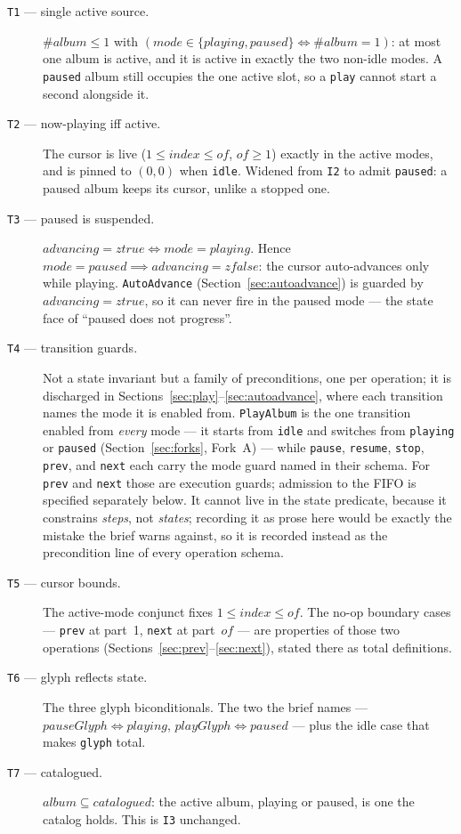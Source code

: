 \documentclass[a4paper,10pt,fleqn]{article}
\begin{document}
\begin{description}
  \item[\texttt{T1} --- single active source.] $\# album \leq 1$ with
    $(mode \in \{ playing, paused \} \iff \# album = 1)$: at most one album is
    active, and it is active in exactly the two non-idle modes. A \texttt{paused}
    album still occupies the one active slot, so a \texttt{play} cannot start a
    second alongside it.
  \item[\texttt{T2} --- now-playing iff active.] The cursor is live
    ($1 \leq index \leq of$, $of \geq 1$) exactly in the active modes, and is
    pinned to $(0,0)$ when \texttt{idle}. Widened from \texttt{I2} to admit
    \texttt{paused}: a paused album keeps its cursor, unlike a stopped one.
  \item[\texttt{T3} --- paused is suspended.] $advancing = ztrue \iff mode =
    playing$. Hence $mode = paused \implies advancing = zfalse$: the cursor
    auto-advances only while playing. \texttt{AutoAdvance}
    (Section~\ref{sec:autoadvance}) is guarded by $advancing = ztrue$, so it can
    never fire in the paused mode --- the state face of ``paused does not
    progress''.
  \item[\texttt{T4} --- transition guards.] Not a state invariant but a family
    of preconditions, one per operation; it is discharged in
    Sections~\ref{sec:play}--\ref{sec:autoadvance}, where each transition names
    the mode it is enabled from. \texttt{PlayAlbum} is the one transition
    enabled from \emph{every} mode --- it starts from \texttt{idle} and switches
    from \texttt{playing} or \texttt{paused} (Section~\ref{sec:forks},
    Fork~A) --- while \texttt{pause}, \texttt{resume}, \texttt{stop},
    \texttt{prev}, and \texttt{next} each carry the mode guard named in their
    schema. For \texttt{prev} and \texttt{next} those are execution guards;
    admission to the FIFO is specified separately below.
    It cannot live in the state predicate, because it constrains
    \emph{steps}, not \emph{states}; recording it as prose here would be
    exactly the mistake the brief warns against, so it is recorded instead as
    the precondition line of every operation schema.
  \item[\texttt{T5} --- cursor bounds.] The active-mode conjunct fixes
    $1 \leq index \leq of$. The no-op boundary cases --- \texttt{prev} at part~1,
    \texttt{next} at part~$of$ --- are properties of those two operations
    (Sections~\ref{sec:prev}--\ref{sec:next}), stated there as total
    definitions.
  \item[\texttt{T6} --- glyph reflects state.] The three glyph biconditionals.
    The two the brief names --- $pauseGlyph \iff playing$, $playGlyph \iff
    paused$ --- plus the idle case that makes \texttt{glyph} total.
  \item[\texttt{T7} --- catalogued.] $album \subseteq catalogued$: the active
    album, playing or paused, is one the catalog holds. This is \texttt{I3}
    unchanged.
\end{description}
\end{document}
